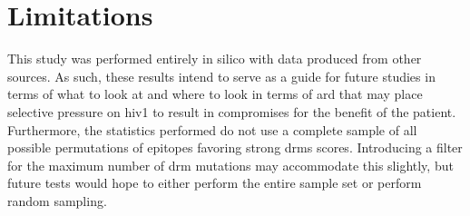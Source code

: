 \section{Limitations}

This study was performed entirely in silico with data produced from other sources. As such, these results intend to serve as a guide for future studies in terms of what to look at and where to look in terms of \ac{ard} that may place selective pressure on \ac{hiv1} to result in compromises for the benefit of the patient. Furthermore, the statistics performed do not use a complete sample of all possible permutations of epitopes favoring strong \acp{drm} scores. Introducing a filter for the maximum number of \ac{drm} mutations may accommodate this slightly, but future tests would hope to either perform the entire sample set or perform random sampling.